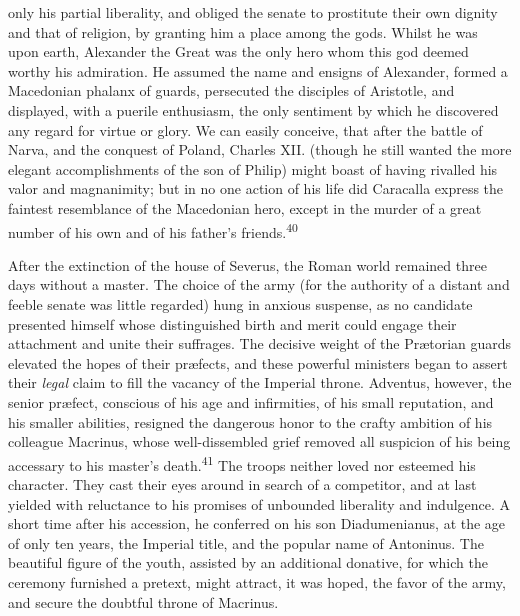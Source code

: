 only his partial liberality, and obliged the senate to prostitute
their own dignity and that of religion, by granting him a place
among the gods. Whilst he was upon earth, Alexander the Great was
the only hero whom this god deemed worthy his admiration. He
assumed the name and ensigns of Alexander, formed a Macedonian
phalanx of guards, persecuted the disciples of Aristotle, and
displayed, with a puerile enthusiasm, the only sentiment by which
he discovered any regard for virtue or glory. We can easily
conceive, that after the battle of Narva, and the conquest of
Poland, Charles XII. (though he still wanted the more elegant
accomplishments of the son of Philip) might boast of having
rivalled his valor and magnanimity; but in no one action of his
life did Caracalla express the faintest resemblance of the
Macedonian hero, except in the murder of a great number of his
own and of his father’s friends.\textsuperscript{40}




After the extinction of the house of Severus, the Roman world
remained three days without a master. The choice of the army (for
the authority of a distant and feeble senate was little regarded)
hung in anxious suspense, as no candidate presented himself whose
distinguished birth and merit could engage their attachment and
unite their suffrages. The decisive weight of the Prætorian
guards elevated the hopes of their præfects, and these powerful
ministers began to assert their \textit{legal} claim to fill the vacancy
of the Imperial throne. Adventus, however, the senior præfect,
conscious of his age and infirmities, of his small reputation,
and his smaller abilities, resigned the dangerous honor to the
crafty ambition of his colleague Macrinus, whose well-dissembled
grief removed all suspicion of his being accessary to his
master’s death.\textsuperscript{41} The troops neither loved nor esteemed his
character. They cast their eyes around in search of a competitor,
and at last yielded with reluctance to his promises of unbounded
liberality and indulgence. A short time after his accession, he
conferred on his son Diadumenianus, at the age of only ten years,
the Imperial title, and the popular name of Antoninus. The
beautiful figure of the youth, assisted by an additional
donative, for which the ceremony furnished a pretext, might
attract, it was hoped, the favor of the army, and secure the
doubtful throne of Macrinus.

